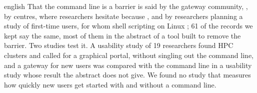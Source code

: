 \begin{onlyin}{english}
That the command line is a barrier is said by the gateway community,
, by centres,
where researchers hesitate because
, and by
researchers planning a study of first-time users, for whom shell
scripting on Linux ; 61 of the records we kept say the same, most
of them in the abstract of a tool built to remove the barrier.  Two
studies test it.  A usability study of 19 researchers found HPC clusters
 and called
for a graphical portal, without singling out the command line, and a
gateway for new users was compared with the command line in a usability
study whose result the abstract does not give\autocite{Sampedro2017Sandstone}.
We found no study that measures how quickly new users get started with
and without a command line.
\end{onlyin}
